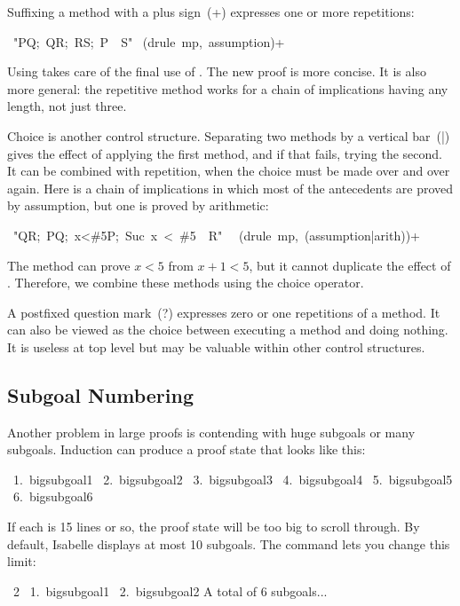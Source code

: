Suffixing a method with a plus sign~(\isa+)
expresses one or more repetitions:
\begin{isabelle}
\ "\isasymlbrakk P\isasymlongrightarrow Q;\ Q\isasymlongrightarrow R;\ R\isasymlongrightarrow S;\ P\isasymrbrakk \ \isasymLongrightarrow \ S"\isanewline
{}\ (drule\ mp,\ assumption)+
\end{isabelle}
%
Using  takes care of the final use of .  The new
proof is more concise.  It is also more general: the repetitive method works
for a chain of implications having any length, not just three.

Choice is another control structure.  Separating two methods by a vertical
bar~(\isa|) gives the effect of applying the first method, and if that fails,
trying the second.  It can be combined with repetition, when the choice must be
made over and over again.  Here is a chain of implications in which most of the
antecedents are proved by assumption, but one is proved by arithmetic:
\begin{isabelle}
\ "\isasymlbrakk Q\isasymlongrightarrow R;\ P\isasymlongrightarrow Q;\ x<\#5\isasymlongrightarrow P;\
Suc\ x\ <\ \#5\isasymrbrakk \ \isasymLongrightarrow \ R"\ \isanewline
\isacommand{by}\ (drule\ mp,\ (assumption|arith))+
\end{isabelle}
The 
method can prove $x<5$ from $x+1<5$, but it cannot duplicate the effect of
\isa{assumption}.  Therefore, we combine these methods using the choice
operator.

A postfixed question mark~(\isa?) expresses zero or one repetitions of a method. 
It can also be viewed as the choice between executing a method and doing nothing. 
It is useless at top level but may be valuable within other control structures. 


\subsection{Subgoal Numbering}

Another problem in large proofs is contending with huge
subgoals or many subgoals.  Induction can produce a proof state that looks
like this:
\begin{isabelle}
\ 1.\ bigsubgoal1\isanewline
\ 2.\ bigsubgoal2\isanewline
\ 3.\ bigsubgoal3\isanewline
\ 4.\ bigsubgoal4\isanewline
\ 5.\ bigsubgoal5\isanewline
\ 6.\ bigsubgoal6
\end{isabelle}
If each \isa{bigsubgoal} is 15 lines or so, the proof state will be too big to
scroll through.  By default, Isabelle displays at most 10 subgoals.  The 
\isacommand{pr} command lets you change this limit:
\begin{isabelle}
\ 2\isanewline
\ 1.\ bigsubgoal1\isanewline
\ 2.\ bigsubgoal2\isanewline
A total of 6 subgoals...
\end{isabelle}

